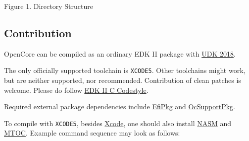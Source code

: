 \documentclass[]{article}
\begin{document}
\begin{center}
\break
\label{fig:DS}
Figure 1. Directory Structure
\end{center}

\subsection{Contribution}\label{configuration-comp}

OpenCore can be compiled as an ordinary EDK II package with
\href{https://github.com/tianocore/tianocore.github.io/wiki/UDK2018}{UDK 2018}.

The only officially supported toolchain is \texttt{XCODE5}. Other toolchains
might work, but are neither supported, nor recommended. Contribution of clean
patches is welcome. Please do follow
\href{https://github.com/tianocore/tianocore.github.io/wiki/Code-Style-C}{EDK II C Codestyle}.

Required external package dependencies include \href{https://github.com/acidanthera/OcSupportPkg}{EfiPkg} and \href{https://github.com/acidanthera/OcSupportPkg}{OcSupportPkg}.

To compile with \texttt{XCODE5}, besides \href{https://developer.apple.com/xcode}{Xcode},
one should also install \href{https://www.nasm.us}{NASM} and
\href{https://github.com/acidanthera/ocbuild/raw/master/external/mtoc-mac64.zip}{MTOC}. Example command sequence may look as follows:
\end{document}
